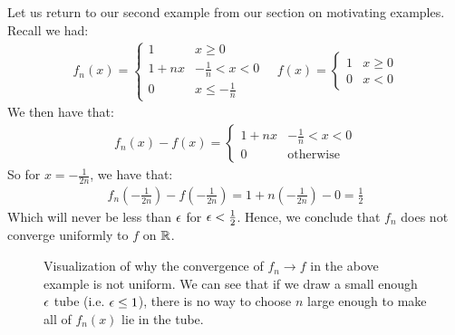 \begin{nexample}{}{}
    Let us return to our second example from our section on motivating examples. Recall we had:
    \begin{align*}
        f_n(x) = \begin{cases}
            1 & x \geq 0
            \\ 1 + nx & -\frac{1}{n} < x < 0
            \\ 0 & x \leq -\frac{1}{n}
        \end{cases} \quad f(x) = \begin{cases}
            1 & x \geq 0
            \\ 0 & x < 0
        \end{cases}
    \end{align*}
    We then have that:
    \begin{align*}
        f_n(x) - f(x) = \begin{cases}
            1 + nx & -\frac{1}{n} < x < 0
            \\ 0 & \text{otherwise}
        \end{cases}
    \end{align*}
    So for $x = -\frac{1}{2n}$, we have that:
    \begin{align*}
        f_n\left(-\frac{1}{2n}\right) - f\left(-\frac{1}{2n}\right) = 1 + n\left(-\frac{1}{2n}\right) - 0 = \frac{1}{2}
    \end{align*}
    Which will never be less than $\epsilon$ for $\epsilon < \frac{1}{2}$. Hence, we conclude that $f_n$ does not converge uniformly to $f$ on $\mathbb{R}$. 
\end{nexample}
\begin{figure}[htbp]
    \centering
    
    \caption{Visualization of why the convergence of $f_n \rightarrow f$ in the above example is not uniform. We can see that if we draw a small enough $\epsilon$ tube (i.e. $\epsilon \leq 1$), there is no way to choose $n$ large enough to make all of $f_n(x)$ lie in the tube.}
    \label{fig41}
\end{figure}
